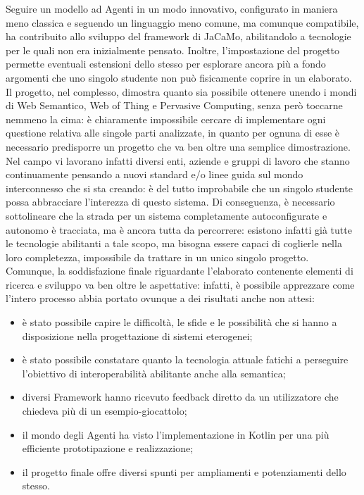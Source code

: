 \documentclass[12pt,a4paper,openright,oneside]{report}
\begin{document}
Seguire un modello ad Agenti in un modo innovativo, configurato in maniera meno classica e seguendo un linguaggio meno comune, ma comunque compatibile, ha contribuito allo sviluppo del framework di JaCaMo, abilitandolo a tecnologie per le quali non era inizialmente pensato. Inoltre, l'impostazione del progetto permette eventuali estensioni dello stesso per esplorare ancora più a fondo argomenti che uno singolo studente non può fisicamente coprire in un elaborato.\\

Il progetto, nel complesso, dimostra quanto sia possibile ottenere unendo i mondi di Web Semantico, Web of Thing e Pervasive Computing, senza però toccarne nemmeno la cima: è chiaramente impossibile cercare di implementare ogni questione relativa alle singole parti analizzate, in quanto per ognuna di esse è necessario predisporre un progetto che va ben oltre una semplice dimostrazione. Nel campo vi lavorano infatti diversi enti, aziende e gruppi di lavoro che stanno continuamente pensando a nuovi standard e/o linee guida sul mondo interconnesso che si sta creando: è del tutto improbabile che un singolo studente possa abbracciare l'interezza di questo sistema. Di conseguenza, è necessario sottolineare che la strada per un sistema completamente autoconfigurate e autonomo è tracciata, ma è ancora tutta da percorrere: esistono infatti già tutte le tecnologie abilitanti a tale scopo, ma bisogna essere capaci di coglierle nella loro completezza, impossibile da trattare in un unico singolo progetto.\\

Comunque, la soddisfazione finale riguardante l'elaborato contenente elementi di ricerca e sviluppo va ben oltre le aspettative: infatti, è possibile apprezzare come l'intero processo abbia portato ovunque a dei risultati anche non attesi:

\begin{itemize}
	\item è stato possibile capire le difficoltà, le sfide e le possibilità che si hanno a disposizione nella progettazione di sistemi eterogenei;
	
	\item è stato possibile constatare quanto la tecnologia attuale fatichi a perseguire l'obiettivo di interoperabilità abilitante anche alla semantica;
	
	\item diversi Framework hanno ricevuto feedback diretto da un utilizzatore che chiedeva più di un esempio-giocattolo;
	
	\item il mondo degli Agenti ha visto l'implementazione in Kotlin per una più efficiente prototipazione e realizzazione;
	
	\item il progetto finale offre diversi spunti per ampliamenti e potenziamenti dello stesso.
\end{itemize}
\end{document}
